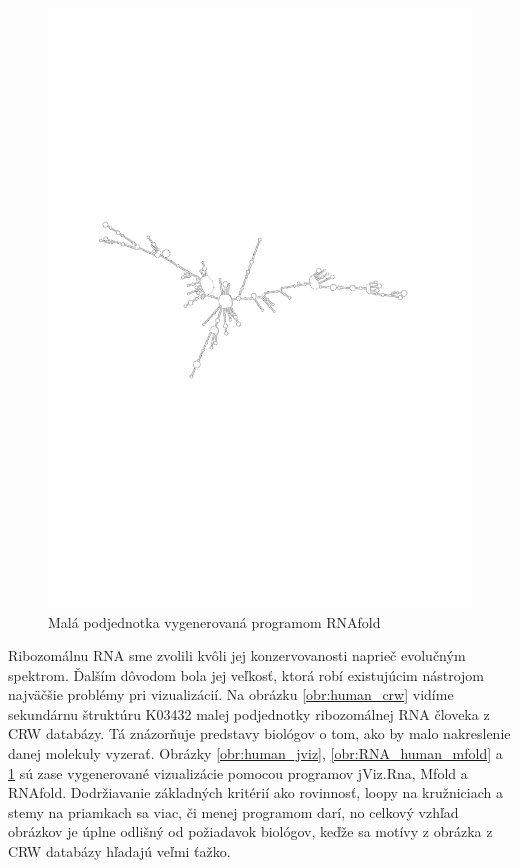 \begin{figure}
  \centering
  \includegraphics[clip, trim=2.5cm 10cm 3cm 10cm, angle=90, width=1\textwidth]{../img/human_RNAfold}
  \caption{Malá podjednotka vygenerovaná programom RNAfold }
  \label{obr:RNA_human_rnafold}
\end{figure}

Ribozomálnu RNA sme zvolili kvôli jej konzervovanosti naprieč evolučným spektrom. Ďalším
dôvodom bola jej veľkosť, ktorá robí existujúcim nástrojom najväčšie problémy
pri vizualizácií. Na obrázku \ref{obr:human_crw} vidíme sekundárnu štruktúru 
K03432 malej podjednotky ribozomálnej RNA človeka z CRW databázy.
Tá znázorňuje predstavy biológov o tom, ako by malo nakreslenie danej molekuly vyzerať.
Obrázky \ref{obr:human_jviz}, \ref{obr:RNA_human_mfold} a \ref{obr:RNA_human_rnafold}
sú zase vygenerované vizualizácie pomocou programov jViz.Rna, Mfold a RNAfold.
Dodržiavanie základných kritérií ako rovinnosť, loopy na kružniciach a stemy na priamkach
sa viac, či menej programom darí, no celkový vzhľad obrázkov je úplne odlišný od požiadavok
biológov, keďže sa motívy z obrázka z CRW databázy hľadajú veľmi ťažko.

